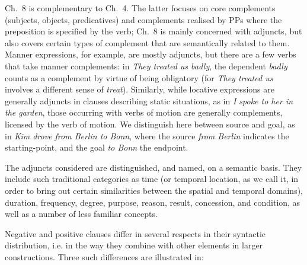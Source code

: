 Ch.~8 is complementary to Ch.~4. The latter focuses on core complements (subjects, objects, predicatives) and complements realised by PPs where the preposition is specified by the verb; Ch.~8 is mainly concerned with adjuncts, but also covers certain types of complement that are semantically related to them. Manner expressions, for example, are mostly adjuncts, but there are a few verbs that take manner complements: in \textit{They treated us badly}, the dependent \textit{badly} counts as a complement by virtue of being obligatory (for \textit{They treated us} involves a different sense of \textit{treat}). Similarly, while locative expressions are generally adjuncts in clauses describing static situations, as in \textit{I spoke to her in the garden}, those occurring with verbs of motion are generally complements, licensed by the verb of motion. We distinguish here between source and goal, as in \textit{Kim drove from Berlin to Bonn}, where the source \textit{from Berlin} indicates the starting-point, and the goal \textit{to Bonn} the endpoint.

The adjuncts considered are distinguished, and named, on a semantic basis. They include such traditional categories as time (or temporal location, as we call it, in order to bring out certain similarities between the spatial and temporal domains), duration, frequency, degree, purpose, reason, result, concession, and condition, as well as a number of less familiar concepts.


Negative and positive clauses differ in several respects in their syntactic distribution, i.e. in the way they combine with other elements in larger constructions. Three such differences are illustrated in:

